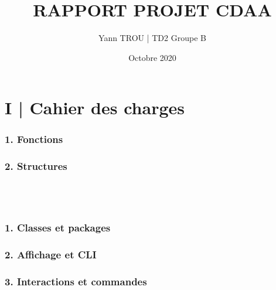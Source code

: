 \documentclass[11pt]{article}
\title{RAPPORT PROJET CDAA}
\author{Yann TROU | TD2 Groupe B}
\date{Octobre 2020}
\begin{document}
\maketitle
\tableofcontents
    
    \vspace{\baselineskip}
    \vspace{\baselineskip}
    
    \chapter{\large{I | Cahier des charges}}
    \begin{center}
        \subsection*{1. Fonctions}
        \subsection*{2. Structures}
    \vspace{\baselineskip}
    \vspace{\baselineskip}
    \end{center}
    
    \chapter{\large{}} \\
    
    \begin{center}
        \subsection*{1. Classes et packages}
        \subsection*{2. Affichage et CLI}
        \subsection*{3. Interactions et commandes}
    \end{center}
    
    \chapter{\Large{}}
    
\end{document}
